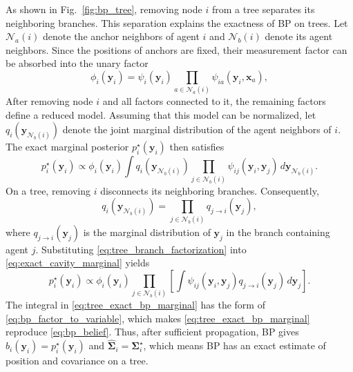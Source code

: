 As shown in Fig.~\ref{fig:bp_tree}, removing node $i$ from a tree separates its neighboring branches. This separation explains the exactness of BP on trees. Let $\mathcal{N}_a(i)$ denote the anchor neighbors of agent $i$ and $\mathcal{N}_b(i)$ denote its agent neighbors. Since the positions of anchors are fixed, their measurement factor can be absorbed into the unary factor
\[
    \phi_i(\mathbf{y}_i)
    =\psi_i(\mathbf{y}_i)
    \prod_{a\in\mathcal{N}_a(i)}
    \psi_{ia}(\mathbf{y}_i,\mathbf{x}_a),
\]
After removing node $i$ and all factors connected to it, the remaining factors define a reduced model. Assuming that this model can be normalized, let $q_i(\mathbf{y}_{\mathcal{N}_b(i)})$ denote the joint marginal distribution of the agent neighbors of $i$. The exact marginal posterior $p_i^\star(\mathbf{y}_i)$ then satisfies
\begin{equation}
    p_i^\star(\mathbf{y}_i)
    \propto
    \phi_i(\mathbf{y}_i)
    \int
    q_i(\mathbf{y}_{\mathcal{N}_b(i)})
    \prod_{j\in\mathcal{N}_b(i)}
    \psi_{ij}(\mathbf{y}_i,\mathbf{y}_j)
    \,d\mathbf{y}_{\mathcal{N}_b(i)}.
    \label{eq:exact_cavity_marginal}
\end{equation}
On a tree, removing $i$ disconnects its neighboring branches. Consequently,
\begin{equation}
    q_i(\mathbf{y}_{\mathcal{N}_b(i)})
    =
    \prod_{j\in\mathcal{N}_b(i)}
    q_{j\rightarrow i}(\mathbf{y}_j),
    \label{eq:tree_branch_factorization}
\end{equation}
where $q_{j\rightarrow i}(\mathbf{y}_j)$ is the marginal distribution of $\mathbf{y}_j$ in the branch containing agent $j$. Substituting \eqref{eq:tree_branch_factorization} into \eqref{eq:exact_cavity_marginal} yields
\begin{equation}
    p_i^\star(\mathbf{y}_i)
    \propto
    \phi_i(\mathbf{y}_i)
    \prod_{j\in\mathcal{N}_b(i)}
    \left[
    \int
    \psi_{ij}(\mathbf{y}_i,\mathbf{y}_j)
    q_{j\rightarrow i}(\mathbf{y}_j)
    \,d\mathbf{y}_j
    \right].
    \label{eq:tree_exact_bp_marginal}
\end{equation}
The integral in \eqref{eq:tree_exact_bp_marginal} has the form of \eqref{eq:bp_factor_to_variable}, which makes \eqref{eq:tree_exact_bp_marginal} reproduce \eqref{eq:bp_belief}. Thus, after sufficient propagation, BP gives $b_i(\mathbf{y}_i)=p_i^\star(\mathbf{y}_i)$ and $\hat{\mathbf{\Sigma}}_i=\mathbf{\Sigma}_i^\star$, which means BP has an exact estimate of position and covariance on a tree.

